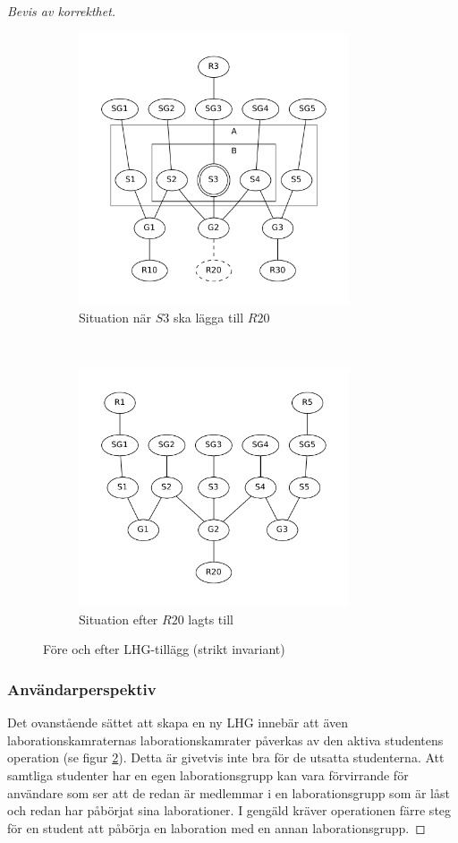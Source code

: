 \begin{proof}[Bevis av korrekthet]
\begin{figure}
  \centering
  \begin{subfigure}[b]{0.5\textwidth}
    \centering
    \includegraphics[width=8.0cm]{fig/labgroup/strict_proof.pdf}
    \caption{Situation när $S3$ ska lägga till $R20$}
    \label{fig:strict-proof}
  \end{subfigure}%
        ~ %
  \begin{subfigure}[b]{0.5\textwidth}
    \centering
    \includegraphics[width=8.0cm]{fig/labgroup/strict_proof_continue.pdf}
    \caption{Situation efter $R20$ lagts till}
    \label{fig:strict-proof-continue}
  \end{subfigure}
  \caption{Före och efter LHG-tillägg (strikt invariant)}\label{fig:animals}
\end{figure}

\subsubsection{Användarperspektiv}
Det ovanstående sättet att skapa en ny LHG innebär att även laborationskamraternas laborationskamrater påverkas av den aktiva studentens operation (se figur \ref{fig:strict-proof-continue}). Detta är givetvis inte bra för de utsatta studenterna. Att samtliga studenter har en egen laborationsgrupp kan vara förvirrande för användare som ser att de redan är medlemmar i en laborationsgrupp som är låst och redan har påbörjat sina laborationer. I gengäld kräver operationen färre steg för en student att påbörja en laboration med en annan laborationsgrupp.


\end{proof}
